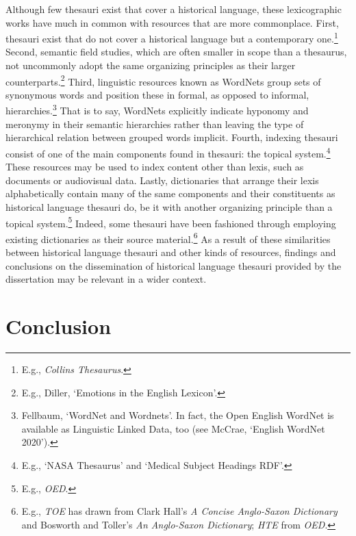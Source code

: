 Although few thesauri exist that cover a historical language, these lexicographic works have much in common with resources that are more commonplace. 
First, thesauri exist that do not cover a historical language but a contemporary one.\footnote{E.g., \textit{Collins Thesaurus}.} 
Second, semantic field studies, which are often smaller in scope than a thesaurus, not uncommonly adopt the same organizing principles as their larger counterparts.\footnote{E.g., Diller, `Emotions in the English Lexicon'.} %
Third, linguistic resources known as WordNets group sets of synonymous words and position these in formal, as opposed to informal, hierarchies.\footnote{Fellbaum, `WordNet and Wordnets'. In fact, the Open English WordNet is available as Linguistic Linked Data, too (see McCrae, `English WordNet 2020').}  That is to say, WordNets explicitly indicate hyponomy and meronymy in their semantic hierarchies rather than leaving the type of hierarchical relation between grouped words implicit.
Fourth, indexing thesauri consist of one of the main components found in thesauri: the topical system.\footnote{E.g., `NASA Thesaurus' and `Medical Subject Headings RDF'.} These resources may be used to index content other than lexis, such as documents or audiovisual data. 
Lastly, dictionaries that arrange their lexis alphabetically contain many of the same components and their constituents as historical language thesauri do, be it with another organizing principle than a topical system.\footnote{E.g., \textit{OED}.} Indeed, some thesauri have been fashioned through employing existing dictionaries as their source material.\footnote{E.g., \textit{TOE} has drawn from Clark Hall's \textit{A Concise Anglo-Saxon Dictionary} and Bosworth and Toller's \textit{An Anglo-Saxon Dictionary}; \textit{HTE} from \textit{OED}.}
As a result of these similarities between historical language thesauri and other kinds of resources, findings and conclusions on the dissemination of historical language thesauri provided by the dissertation may be relevant in a wider context.


\section{Conclusion}


